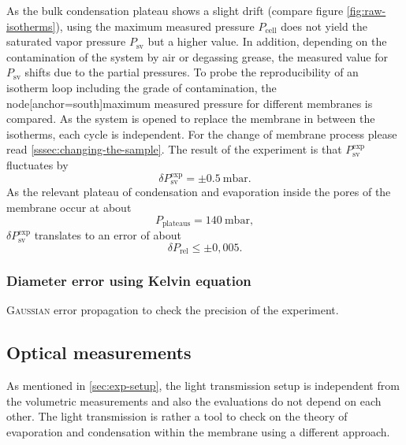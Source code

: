 \documentclass[../thesis.tex]{subfiles}
\begin{document}
            As the bulk condensation plateau shows a slight drift (compare figure \cref{fig:raw-isotherms}), using the maximum measured pressure $P_\mathrm{cell}$ does not yield the saturated vapor pressure $P_\mathrm{sv}$ but a higher value. In addition, depending on the contamination of the system by air or degassing grease, the measured value for $P_\mathrm{sv}$ shifts due to the partial pressures. To probe the reproducibility of an isotherm loop including the grade of contamination, the  node[anchor=south]maximum measured pressure for different membranes is compared. As the system is opened to replace the membrane in between the isotherms, each cycle is independent. For the change of membrane process please read \cref{sssec:changing-the-sample}. The result of the experiment is that $P_\mathrm{sv}^\mathrm{exp}$ fluctuates by
            \begin{equation}
                \delta P_\mathrm{sv}^\mathrm{exp} = \pm \SI{0,5}{\milli\bar}.
                \label{eq:delta-Psat}
            \end{equation}
            As the relevant plateau of condensation and evaporation inside the pores of the membrane occur at about
            \begin{equation}
                P_\mathrm{plateaus} = \SI{140}{\milli\bar},
            \end{equation}
            $\delta P_\mathrm{sv}^\mathrm{exp}$ translates to an error of about
            \begin{equation}
                \delta P_\mathrm{rel} \le \pm 0,005.
                \label{eq:delta-Prel}
            \end{equation}


          \subsubsection{Diameter error using Kelvin equation}

            \textsc{Gaussian} error propagation to check the precision of the experiment.


        \subsection{Optical measurements}
        \label{subsec:optical-computation}

          As mentioned in \cref{sec:exp-setup}, the light transmission setup is independent from the volumetric measurements and also the evaluations do not depend on each other. The light transmission is rather a tool to check on the theory of evaporation and condensation within the membrane using a different approach.
          \medskip
\end{document}

